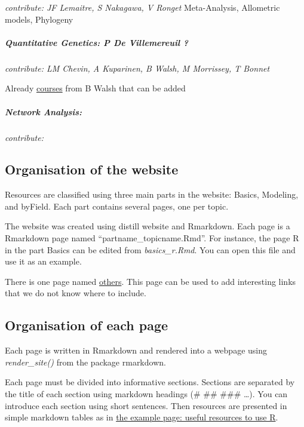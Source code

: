 \documentclass[
]{article}
\begin{document}
\emph{contribute: JF Lemaitre, S Nakagawa, V Ronget} Meta-Analysis,
Allometric models, Phylogeny

\hypertarget{quantitative-genetics-p-de-villemereuil}{%
\subparagraph{Quantitative Genetics: P De Villemereuil
?}\label{quantitative-genetics-p-de-villemereuil}}

\emph{contribute: LM Chevin, A Kuparinen, B Walsh, M Morrissey, T
Bonnet}

Already \href{https://www.youtube.com/watch?v=U-MTfNw7IvM}{courses} from
B Walsh that can be added

\hypertarget{network-analysis}{%
\subparagraph{Network Analysis:}\label{network-analysis}}

\emph{contribute: }

\hypertarget{organisation-of-the-website-1}{%
\subsection{Organisation of the
website}\label{organisation-of-the-website-1}}

Resources are classified using three main parts in the website: Basics,
Modeling, and byField. Each part contains several pages, one per topic.

The website was created using distill website and Rmarkdown. Each page
is a Rmarkdown page named ``partname\_topicname.Rmd''. For instance, the
page R in the part Basics can be edited from \emph{basics\_r.Rmd}. You
can open this file and use it as an example.

There is one page named \href{others.html}{others}. This page can be
used to add interesting links that we do not know where to include.

\hypertarget{organisation-of-each-page}{%
\subsection{Organisation of each page}\label{organisation-of-each-page}}

Each page is written in Rmarkdown and rendered into a webpage using
\emph{render\_site()} from the package rmarkdown.

Each page must be divided into informative sections. Sections are
separated by the title of each section using markdown headings (\# \#\#
\#\#\# \ldots). You can introduce each section using short sentences.
Then resources are presented in simple markdown tables as in
\href{basics_r.html}{the example page: useful resources to use R}.
\end{document}
